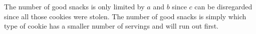 The number of good snacks is only limited by $a$ and $b$ since $c$ can be disregarded since all those cookies were stolen. The number of good snacks is simply which type of cookie has a smaller number of servings and will run out first.
